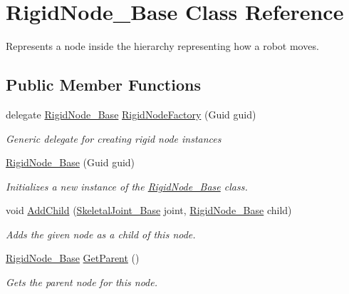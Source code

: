 \hypertarget{class_rigid_node___base}{}\section{Rigid\+Node\+\_\+\+Base Class Reference}
\label{class_rigid_node___base}


Represents a node inside the hierarchy representing how a robot moves.  


\subsection*{Public Member Functions}
\begin{DoxyCompactItemize}
\item 
delegate \hyperlink{class_rigid_node___base}{Rigid\+Node\+\_\+\+Base} \hyperlink{class_rigid_node___base_ae13cbb7e730cd0e19c77efa84edbceca}{Rigid\+Node\+Factory} (Guid guid)
\begin{DoxyCompactList}\small\item\em Generic delegate for creating rigid node instances \end{DoxyCompactList}\item 
\hyperlink{class_rigid_node___base_ad717bbf1b9a1b28d24dbdf7242cf4a1b}{Rigid\+Node\+\_\+\+Base} (Guid guid)
\begin{DoxyCompactList}\small\item\em Initializes a new instance of the \hyperlink{class_rigid_node___base}{Rigid\+Node\+\_\+\+Base} class. \end{DoxyCompactList}\item 
void \hyperlink{class_rigid_node___base_a287e7e27c6fc9d2b104e6f2578e96af8}{Add\+Child} (\hyperlink{class_skeletal_joint___base}{Skeletal\+Joint\+\_\+\+Base} joint, \hyperlink{class_rigid_node___base}{Rigid\+Node\+\_\+\+Base} child)
\begin{DoxyCompactList}\small\item\em Adds the given node as a child of this node. \end{DoxyCompactList}\item 
\hyperlink{class_rigid_node___base}{Rigid\+Node\+\_\+\+Base} \hyperlink{class_rigid_node___base_a8889037fe9b28dbebcdcf670899406b4}{Get\+Parent} ()
\begin{DoxyCompactList}\small\item\em Gets the parent node for this node. \end{DoxyCompactList}\item 

\end{DoxyCompactItemize}

